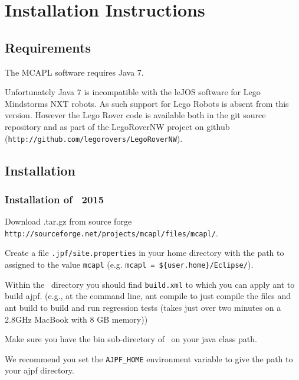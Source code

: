 \chapter{Installation Instructions}
\label{chap:installation}
\section{Requirements}

The MCAPL software requires Java 7.  

\begin{sloppypar}
Unfortunately Java 7 is incompatible with the leJOS software for Lego Mindstorms NXT robots.  As such support for Lego Robots is absent from this version.  However the Lego Rover code is available both in the git source repository and as part of the LegoRoverNW project on github (\texttt{http://github.com/legorovers/LegoRoverNW}).
\end{sloppypar}

\section{Installation}

\subsection{Installation of \ajpf\ 2015}

\begin{itemize}
\begin{sloppypar}
\item Download \ajpfversion.tar.gz from source forge \texttt{http://sourceforge.net/projects/mcapl/files/mcapl/}.
\end{sloppypar}
\item Create a file \texttt{.jpf/site.properties} in your home directory with the path to \ajpfversion assigned to the value \texttt{mcapl} (e.g. \texttt{mcapl = \$\{user.home\}/Eclipse/\ajpfversion}).
\item Within the \ajpfversion\ directory you should find \texttt{build.xml} to which you can apply ant to build ajpf. (e.g., at the command line, ant compile to just compile the files and ant build to build and run regression tests (takes just over two minutes on a 2.8GHz MacBook with 8 GB memory))
\item Make sure you have the bin sub-directory of \ajpfversion\ on your java class path.
\item We recommend you set the \texttt{AJPF\_HOME} environment variable to give the path to your ajpf directory.
\end{itemize}


